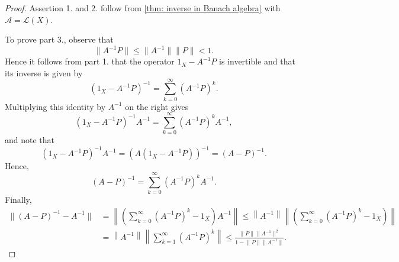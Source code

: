 \begin{proof}
    Assertion 1. and 2. follow from \autoref{thm: inverse in Banach algebra} with \(\mathcal{A} = \mathcal{L} (X)\).

    To prove part 3., observe that  
    \[
        \lVert A^{-1} P \rVert \le \lVert A^{-1} \rVert \lVert P \rVert < 1.   
    \]  
    Hence it follows from part 1. that the operator \(1_X - A^{-1} P\) is invertible and that its inverse is given by 
    \[
        \left( 1_X - A^{-1} P \right)^{-1} = \sum_{k=0}^{\infty} (A^{-1} P)^k.  
    \] 
    Multiplying this identity by \(A^{-1}\) on the right gives 
    \[
       \left( 1_X - A^{-1} P \right)^{-1} A^{-1} = \sum_{k=0}^{\infty} (A^{-1} P)^k A^{-1}, 
    \] 
    and note that 
    \[
        \left( 1_X - A^{-1} P \right)^{-1} A^{-1} = \left( A (1_X - A^{-1} P) \right)^{-1} = \left( A - P \right)^{-1}. 
    \]
    Hence,
    \[
       \left( A - P \right)^{-1} = \sum_{k=0}^{\infty} (A^{-1} P)^k A^{-1}. 
    \]
    Finally,
    \begin{align*}
        \lVert (A - P)^{-1} - A^{-1} \rVert &= \left\lVert \left( \sum_{k=0}^{\infty} (A^{-1} P)^k - 1_X \right) A^{-1}   \right\rVert \le \left\lVert A^{-1} \right\rVert \left\lVert \left( \sum_{k=0}^{\infty} (A^{-1} P)^k - 1_X \right) \right\rVert \\
        &= \left\lVert A^{-1} \right\rVert \left\lVert \sum_{k=1}^{\infty} (A^{-1} P)^k   \right\rVert \le \frac{\lVert P \rVert \lVert A^{-1} \rVert^2  }{1 - \lVert P \rVert \lVert A^{-1} \rVert  }.
    \end{align*}
\end{proof}